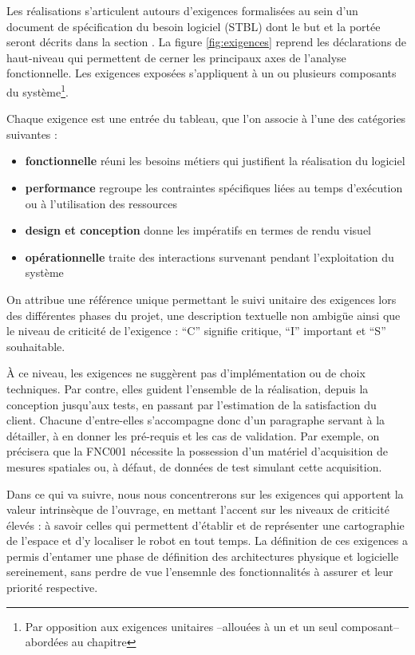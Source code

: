 Les réalisations s'articulent autours d'exigences formalisées au sein d'un document de spécification du besoin logiciel (\gls{STBL}) dont le but et la portée seront décrits dans la section .
La figure \ref{fig:exigences} reprend les déclarations de haut-niveau qui permettent de cerner les principaux axes de l'analyse fonctionnelle. 
Les exigences exposées s'appliquent à un ou plusieurs composants du système\footnote{Par opposition aux exigences unitaires --allouées à un et un seul composant-- abordées au chapitre }. 
  
Chaque exigence est une entrée du tableau, que l'on associe à l'une des catégories suivantes : 

\begin{itemize}
 \item \textbf{fonctionnelle} réuni les besoins métiers qui justifient la réalisation du logiciel
 \item \textbf{performance} regroupe les contraintes spécifiques liées au temps d'exécution ou à l'utilisation des ressources 
 \item \textbf{design et conception} donne les impératifs en termes de rendu visuel
 \item \textbf{opérationnelle} traite des interactions survenant pendant l'exploitation du système
\end{itemize}

On attribue une référence unique permettant le suivi unitaire des exigences lors des différentes phases du projet, une description textuelle non ambigüe ainsi que le niveau de criticité de l'exigence :
``C'' signifie critique, ``I'' important et  ``S'' souhaitable. 

\`{A} ce niveau, les exigences ne suggèrent pas d'implémentation ou de choix techniques. 
Par contre, elles guident l'ensemble de la réalisation, depuis la conception jusqu'aux tests, en passant par l'estimation de la satisfaction du client. 
Chacune d'entre-elles s'accompagne donc d'un paragraphe servant à la détailler, à en donner les pré-requis et les cas de validation.
Par exemple, on précisera que la FNC001 nécessite la possession d'un matériel d'acquisition de mesures spatiales ou, à défaut, de données de test simulant cette acquisition. 

Dans ce qui va suivre, nous nous concentrerons sur les exigences qui apportent la valeur intrinsèque de l'ouvrage, en mettant l'accent sur les niveaux de criticité élevés : à savoir celles qui 
permettent d'établir et de représenter une cartographie de l'espace et d'y localiser le robot en tout temps. 
La définition de ces exigences a permis d'entamer une phase de définition des architectures physique et logicielle sereinement, sans perdre de vue l'ensemnle des fonctionnalités à assurer et leur priorité respective. 

